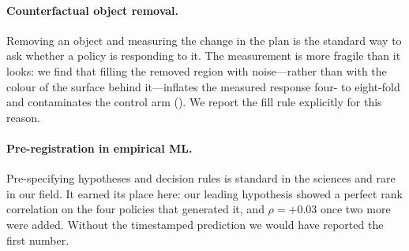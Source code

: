 \paragraph{Counterfactual object removal.}
Removing an object and measuring the change in the plan is the standard way to ask
whether a policy is responding to it. The measurement is more fragile than it looks:
we find that filling the removed region with noise---rather than with the colour of
the surface behind it---inflates the measured response four- to eight-fold and
contaminates the control arm (). We report the fill rule explicitly
for this reason.

\paragraph{Pre-registration in empirical ML.}
Pre-specifying hypotheses and decision rules is standard in the sciences and rare in
our field. It earned its place here: our leading hypothesis showed a perfect rank
correlation on the four policies that generated it, and $\rho = +0.03$ once two more
were added. Without the timestamped prediction we would have reported the first
number.
